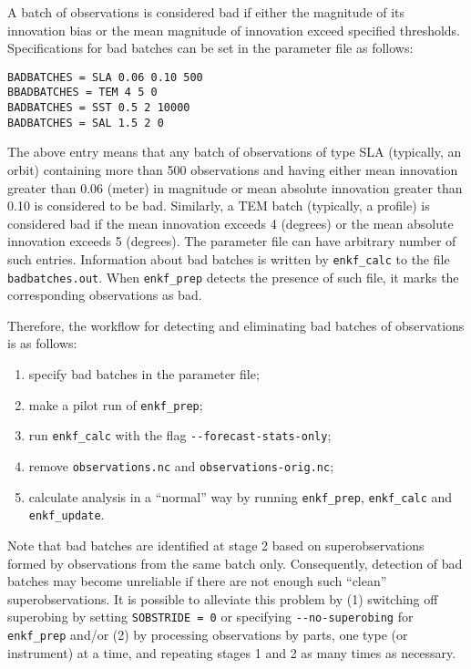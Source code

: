 \documentclass[11pt]{report}
\begin{document}
A batch of observations is considered bad if either the magnitude of its innovation bias or the mean magnitude of innovation exceed specified thresholds.
Specifications for bad batches can be set in the parameter file as follows:
\begin{Verbatim}[frame=single,fontsize=\footnotesize]
BADBATCHES = SLA 0.06 0.10 500
BBADBATCHES = TEM 4 5 0
BADBATCHES = SST 0.5 2 10000
BADBATCHES = SAL 1.5 2 0
\end{Verbatim}
The above entry means that any batch of observations of type SLA (typically, an orbit) containing more than 500 observations and having either mean innovation greater than 0.06 (meter) in magnitude or mean absolute innovation greater than 0.10 is considered to be bad.
Similarly, a TEM batch (typically, a profile) is considered bad if the mean innovation exceeds 4 (degrees) or the mean absolute innovation exceeds 5 (degrees).
The parameter file can have arbitrary number of such entries.
Information about bad batches is written by \verb|enkf_calc| to the file \verb|badbatches.out|.
When \verb|enkf_prep| detects the presence of such file, it marks the corresponding observations as bad.

Therefore, the workflow for detecting and eliminating bad batches of observations is as follows:
\begin{enumerate}
\item specify bad batches in the parameter file;
\item make a pilot run of \verb|enkf_prep|;
\item run \verb|enkf_calc| with the flag \verb|--forecast-stats-only|;
\item remove \verb|observations.nc| and \verb|observations-orig.nc|;
\item calculate analysis in a ``normal'' way by running \verb|enkf_prep|, \verb|enkf_calc| and \verb|enkf_update|.
\end{enumerate}

Note that bad batches are identified at stage 2 based on superobservations formed by observations from the same batch only.
Consequently, detection of bad batches may become unreliable if there are not enough such ``clean'' superobservations.
It is possible to alleviate this problem by (1) switching off superobing by setting \verb|SOBSTRIDE = 0| or specifying \verb|--no-superobing| for \verb|enkf_prep| and/or (2) by processing observations by parts, one type (or instrument) at a time, and repeating stages 1 and 2 as many times as necessary.
\end{document}
